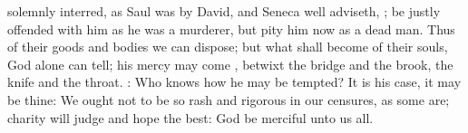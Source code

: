 solemnly interred, as Saul was by David,  and
Seneca well adviseth, ; be
justly offended with him as he was a murderer, but pity him now as a dead man.
Thus of their goods and bodies we can dispose; but what shall become of their
souls, God alone can tell; his mercy may come , betwixt the bridge and the brook, the knife and the
throat. : Who knows how he may be
tempted? It is his case, it may be thine:  We ought not to be so rash and
rigorous in our censures, as some are; charity will judge and hope the best:
God be merciful unto us all.
